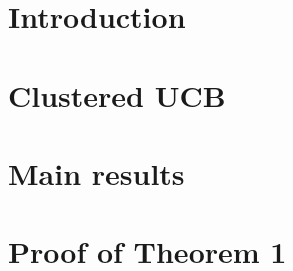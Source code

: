 \documentclass[twoside]{article}
\begin{document}
\begin{abstract}

\end{abstract}

\section{Introduction}
\label{sec:intro}


\section{Clustered UCB}
\label{sec:clusucb}


\section{Main results}
\label{sec:results}


\section{Proof of Theorem 1}
\label{sec:proofTheorem}

\end{document}

